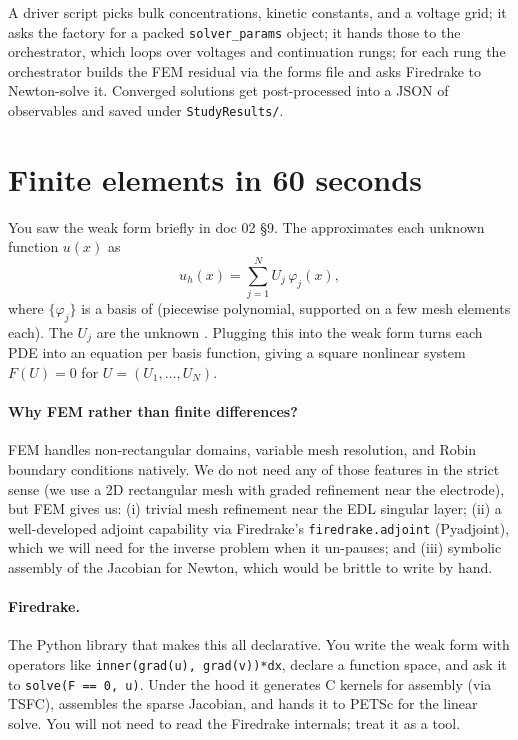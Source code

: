 \documentclass[11pt]{article}
\begin{document}
A driver script picks bulk concentrations, kinetic constants, and a
voltage grid; it asks the factory for a packed
\texttt{solver\_params} object; it hands those to the orchestrator,
which loops over voltages and continuation rungs; for each rung the
orchestrator builds the FEM residual via the forms file and asks
Firedrake to Newton-solve it. Converged solutions get post-processed
into a JSON of observables and saved under \texttt{StudyResults/}.

\section{Finite elements in 60 seconds}

You saw the weak form briefly in doc 02 \S 9. The
 approximates each unknown
function $u(x)$ as
\[
  u_h(x) = \sum_{j=1}^{N} U_j\, \varphi_j(x),
\]
where $\{\varphi_j\}$ is a basis of 
(piecewise polynomial, supported on a few mesh elements each). The
$U_j$ are the unknown . Plugging
this into the weak form turns each PDE into an equation per basis
function, giving a square nonlinear system $F(U) = 0$ for
$U = (U_1, \dots, U_N)$.

\paragraph{Why FEM rather than finite differences?} FEM handles
non-rectangular domains, variable mesh resolution, and Robin
boundary conditions natively. We do not need any of those
features in the strict sense (we use a 2D rectangular mesh with
graded refinement near the electrode), but FEM gives us:
(i) trivial mesh refinement near the EDL singular layer;
(ii) a well-developed adjoint capability via Firedrake's
\texttt{firedrake.adjoint} (Pyadjoint), which we will need for the
inverse problem when it un-pauses; and
(iii) symbolic assembly of the Jacobian for Newton, which would be
brittle to write by hand.

\paragraph{Firedrake.} The Python library that makes this all
declarative. You write the weak form with operators like
\texttt{inner(grad(u), grad(v))*dx}, declare a function space, and
ask it to \texttt{solve(F == 0, u)}. Under the hood it generates C
kernels for assembly (via TSFC), assembles the sparse Jacobian, and
hands it to PETSc for the linear solve. You will not need to read
the Firedrake internals; treat it as a tool.
\end{document}
